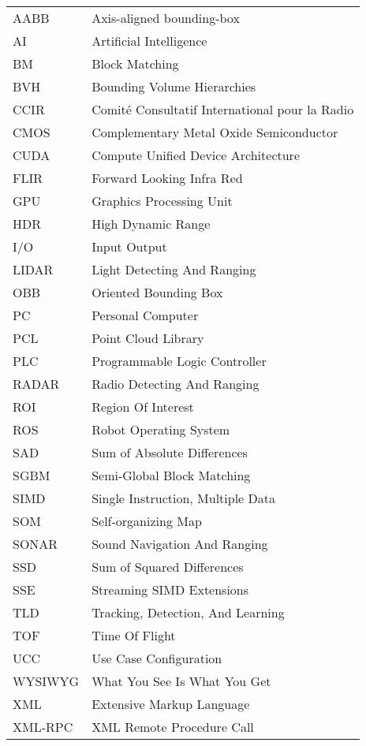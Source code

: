 \documentclass[12pt,a4paper,oneside,pdftex]{report}
\begin{document}
\noindent
\begin{longtable}{@{}p{}p{}@{}}
AABB & Axis-aligned bounding-box \\
AI & Artificial Intelligence \\
BM & Block Matching \\
BVH & Bounding Volume Hierarchies \\
CCIR & Comité Consultatif International pour la Radio \\
CMOS & Complementary Metal Oxide Semiconductor \\
CUDA & Compute Unified Device Architecture \\
FLIR & Forward Looking Infra Red \\
GPU & Graphics Processing Unit \\
HDR & High Dynamic Range \\
I/O & Input Output\\
LIDAR & Light Detecting And Ranging \\
OBB & Oriented Bounding Box \\
PC & Personal Computer \\
PCL & Point Cloud Library \\
PLC & Programmable Logic Controller \\
RADAR & Radio Detecting And Ranging \\
ROI & Region Of Interest \\
ROS & Robot Operating System \\
SAD & Sum of Absolute Differences \\
SGBM & Semi-Global Block Matching \\
SIMD & Single Instruction, Multiple Data \\
SOM & Self-organizing Map \\
SONAR & Sound Navigation And Ranging \\
SSD & Sum of Squared Differences \\
SSE & Streaming SIMD Extensions \\
TLD & Tracking, Detection, And Learning \\
TOF & Time Of Flight \\
UCC & Use Case Configuration \\
WYSIWYG & What You See Is What You Get \\
XML & Extensive Markup Language \\
XML-RPC & XML Remote Procedure Call \\ 
\end{longtable}
\end{document}
